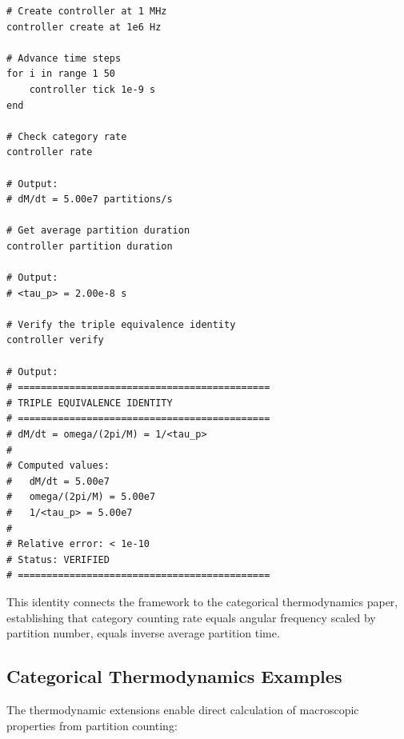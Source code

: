 \documentclass[twocolumn,10pt]{article}
\begin{document}
\begin{lstlisting}[caption={Triple equivalence verification}]
# Create controller at 1 MHz
controller create at 1e6 Hz

# Advance time steps
for i in range 1 50
    controller tick 1e-9 s
end

# Check category rate
controller rate

# Output:
# dM/dt = 5.00e7 partitions/s

# Get average partition duration
controller partition duration

# Output:
# <tau_p> = 2.00e-8 s

# Verify the triple equivalence identity
controller verify

# Output:
# ============================================
# TRIPLE EQUIVALENCE IDENTITY
# ============================================
# dM/dt = omega/(2pi/M) = 1/<tau_p>
#
# Computed values:
#   dM/dt = 5.00e7
#   omega/(2pi/M) = 5.00e7
#   1/<tau_p> = 5.00e7
#
# Relative error: < 1e-10
# Status: VERIFIED
# ============================================
\end{lstlisting}

This identity connects the framework to the categorical thermodynamics paper, establishing that category counting rate equals angular frequency scaled by partition number, equals inverse average partition time.

\subsection{Categorical Thermodynamics Examples}

The thermodynamic extensions enable direct calculation of macroscopic properties from partition counting:
\end{document}

